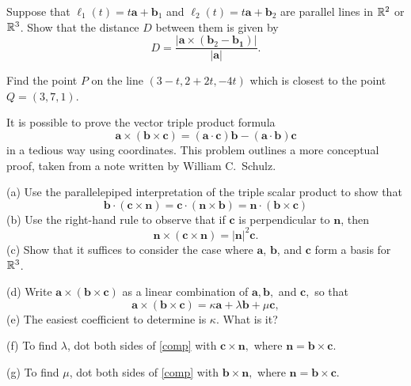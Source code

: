 \documentclass{watsonbook}
\begin{document}
\begin{aexercise}
  Suppose that $\ell_1(t)=t\mathbf{a}+\mathbf{b}_1$ and
  $\ell_2(t)=t\mathbf{a}+\mathbf{b}_2$ are parallel lines in $\mathbb{R}^2$ or
  $\mathbb{R}^3$. Show that the distance $D$ between them is given by
  \[
    D =
    \frac{|\mathbf{a}\times(\mathbf{b}_2-\mathbf{b_1})|}{|\mathbf{a}|}.
  \]
\end{aexercise}

\begin{aexercise}
  Find the point $P$ on the line $(3-t,2+2t,-4t)$ which is closest to
  the point $Q=(3,7,1)$.
\end{aexercise}

\begin{aexercise}%
  It is possible to prove the vector triple product formula
  \[
    \mathbf{a}\times(\mathbf{b}\times\mathbf{c}) =
    (\mathbf{a}\cdot\mathbf{c})\mathbf{b} -
    (\mathbf{a}\cdot\mathbf{b})\mathbf{c}
  \]
  in a tedious way using coordinates. This problem outlines a more
  conceptual proof, taken from a note written by William C.\ Schulz.

  (a) Use the parallelepiped interpretation of the triple scalar
  product to show that
  \[
    \mathbf{b}\cdot(\mathbf{c}\times\mathbf{n}) =
    \mathbf{c}\cdot(\mathbf{n}\times\mathbf{b}) =
    \mathbf{n}\cdot(\mathbf{b}\times\mathbf{c})
  \]
  (b) Use the right-hand rule to observe that if $\mathbf{c}$ is
  perpendicular to $\mathbf{n}$, then
  \[
    \mathbf{n}\times(\mathbf{c}\times\mathbf{n}) =
    |\mathbf{n}|^2\mathbf{c}.
  \]
  (c) Show that it suffices to consider the case where $\mathbf{a}$,
  $\mathbf{b}$, and $\mathbf{c}$ form a basis for $\mathbb{R}^3$.

  (d) Write $\mathbf{a}\times(\mathbf{b}\times\mathbf{c})$ as a linear
  combination of $\mathbf{a}, \mathbf{b},$ and $\mathbf{c},$ so that
  \begin{equation} \label{comp}
    \mathbf{a}\times(\mathbf{b}\times\mathbf{c}) = \kappa
    \mathbf{a}+\lambda \mathbf{b}+\mu\mathbf{c},
  \end{equation} 
  (e) The easiest coefficient to determine is $\kappa$. What is it?

  (f) To find $\lambda$, dot both sides of \eqref{comp} with
  $\mathbf{c}\times \mathbf{n},$ where
  $\mathbf{n}=  \mathbf{b}\times\mathbf{c}$.

  (g) To find $\mu$, dot both sides of \eqref{comp} with
  $\mathbf{b}\times \mathbf{n},$ where
  $\mathbf{n}=  \mathbf{b}\times\mathbf{c}$.
\end{aexercise}
\end{document}

